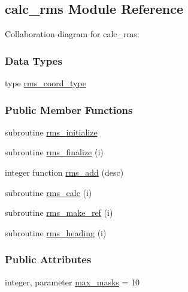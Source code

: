 \hypertarget{classcalc__rms}{\subsection{calc\-\_\-rms Module Reference}
\label{classcalc__rms}
}


Collaboration diagram for calc\-\_\-rms\-:
\subsubsection*{Data Types}
\begin{DoxyCompactItemize}
\item 
type \hyperlink{structcalc__rms_1_1rms__coord__type}{rms\-\_\-coord\-\_\-type}
\end{DoxyCompactItemize}
\subsubsection*{Public Member Functions}
\begin{DoxyCompactItemize}
\item 
subroutine \hyperlink{classcalc__rms_aa5acf10d18cc6a1f64f3388951dbd5fd}{rms\-\_\-initialize}
\item 
subroutine \hyperlink{classcalc__rms_a4753dc26621e5a66675acefb3e85b0ba}{rms\-\_\-finalize} (i)
\item 
integer function \hyperlink{classcalc__rms_ae0ddbab6b86b26808306b08522944087}{rms\-\_\-add} (desc)
\item 
subroutine \hyperlink{classcalc__rms_a79e74aee349411bedf7f3c71a81b25bb}{rms\-\_\-calc} (i)
\item 
subroutine \hyperlink{classcalc__rms_aa7448d6c01ae57e401ff6ca9cd4cceda}{rms\-\_\-make\-\_\-ref} (i)
\item 
subroutine \hyperlink{classcalc__rms_a8d1a0fac027ef6b1f98c5d988fe2f9c8}{rms\-\_\-heading} (i)
\end{DoxyCompactItemize}
\subsubsection*{Public Attributes}
\begin{DoxyCompactItemize}
\item 
integer, parameter \hyperlink{classcalc__rms_ae2b830ba7835ceafcb4e529ffdaeaa80}{max\-\_\-masks} = 10
\end{DoxyCompactItemize}
